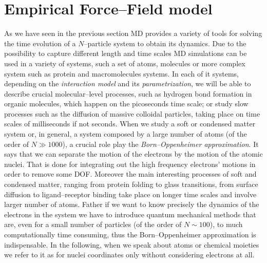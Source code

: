 \section{Empirical Force--Field model}
\label{sec:EmpiricalFF}
As we have seen in the previous section \ac{MD} provides a variety of tools for solving the time evolution of a $N$--particle system to obtain its dynamics. Due to the possibility to capture different length and time scales \ac{MD} simulations can be used in a variety of systems, such a set of atoms, molecules or more complex system such as protein and macromolecules systems. In each of it systems, depending on the \textit{interaction model} and its \textit{parametrization}, we will be able to describe crucial molecular--level processes, such as hydrogen bond formation in organic molecules, which happen on the picoseconds time scale; or study slow processes such as the diffusion of massive colloidal particles, taking place on time scales of milliseconds if not seconds. When we study a soft or condensed matter system or, in general, a system composed by a large number of atoms (of the order of $N \gg 1000$), a crucial role play the \textit{Born--Oppenheimer approximation}. It says that we can separate the motion of the electrons by the motion of the atomic nuclei. That is done for integrating out the high frequency electrons' motions in order to remove some \ac{DOF}. Moreover the main interesting processes of soft and condensed matter, ranging from protein folding to glass transitions, from surface diffusion to ligand--receptor binding take place on longer time scales and involve larger number of atoms. Father if we want to know precisely the dynamics of the electrons in the system we have to introduce quantum mechanical methods that are, even for a small number of particles (of the order of $N\sim 100$), to much computationally time consuming, thus the Born--Oppenheimer approximation is indispensable. In the following, when we speak about atoms or chemical moieties we refer to it as for nuclei coordinates only without considering electrons at all.

